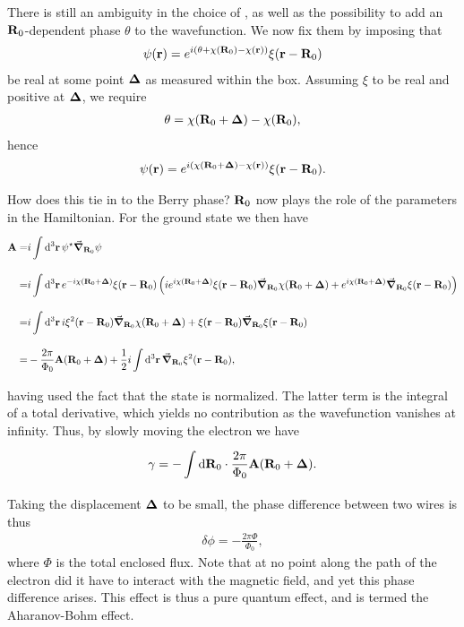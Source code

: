 There is still an ambiguity in the choice of \chi, as well as the possibility to add an $\vb{R}_{0}$-dependent phase $\theta$ to the wavefunction. We now fix them by imposing that
\begin{align*}
	\psi(\vb{r}) = e^{i(\theta + \chi(\vb{R}_{0}) - \chi(\vb{r}))}\xi(\vb{r} - \vb{R}_{0})
\end{align*}
be real at some point $\vb*{\Delta}$ as measured within the box. Assuming $\xi$ to be real and positive at $\vb*{\Delta}$, we require
\begin{align*}
	\theta = \chi(\vb{R}_{0} + \vb*{\Delta}) - \chi(\vb{R}_{0}),
\end{align*}
hence
\begin{align*}
	\psi(\vb{r}) = e^{i(\chi(\vb{R}_{0} + \vb*{\Delta}) - \chi(\vb{r}))}\xi(\vb{r} - \vb{R}_{0}).
\end{align*}

How does this tie in to the Berry phase? $\vb{R}_{0}$ now plays the role of the parameters in the Hamiltonian. For the ground state we then have
\begin{align*}
	\vb{A} =& i\int\limits_{}^{}\dd[3]{\vb{r}}\psi^{\star}\grad_{\vb{R}_{0}}\psi \\
	       =& i\int\limits_{}^{}\dd[3]{\vb{r}}e^{-i\chi(\vb{R}_{0} + \vb*{\Delta})}\xi(\vb{r} - \vb{R}_{0})\left(ie^{i\chi(\vb{R}_{0} + \vb*{\Delta})}\xi(\vb{r} - \vb{R}_{0})\grad_{\vb{R}_{0}}\chi(\vb{R}_{0} + \vb*{\Delta}) + e^{i\chi(\vb{R}_{0} + \vb*{\Delta})}\grad_{\vb{R}_{0}}\xi(\vb{r} - \vb{R}_{0})\right) \\
	       =& i\int\limits_{}^{}\dd[3]{\vb{r}}i\xi^{2}(\vb{r} - \vb{R}_{0})\grad_{\vb{R}_{0}}\chi(\vb{R}_{0} + \vb*{\Delta}) + \xi(\vb{r} - \vb{R}_{0})\grad_{\vb{R}_{0}}\xi(\vb{r} - \vb{R}_{0}) \\
	       =& -\frac{2\pi}{\Phi_{0}}\vb{A}(\vb{R}_{0} + \vb*{\Delta}) + \frac{1}{2}i\int\limits_{}^{}\dd[3]{\vb{r}}\grad_{\vb{R}_{0}}\xi^{2}(\vb{r} - \vb{R}_{0}),
\end{align*}
having used the fact that the state is normalized. The latter term is the integral of a total derivative, which yields no contribution as the wavefunction vanishes at infinity. Thus, by slowly moving the electron we have
\begin{align*}
	\gamma = -\int\limits_{}^{}\dd{\vb{R}_{0}}\cdot\frac{2\pi}{\Phi_{0}}\vb{A}(\vb{R}_{0} + \vb*{\Delta}).
\end{align*}
Taking the displacement $\vb*{\Delta}$ to be small, the phase difference between two wires is thus
\begin{align*}
	\delta\phi = -\frac{2\pi\Phi}{\Phi_{0}},
\end{align*}
where $\Phi$ is the total enclosed flux. Note that at no point along the path of the electron did it have to interact with the magnetic field, and yet this phase difference arises. This effect is thus a pure quantum effect, and is termed the Aharanov-Bohm effect.